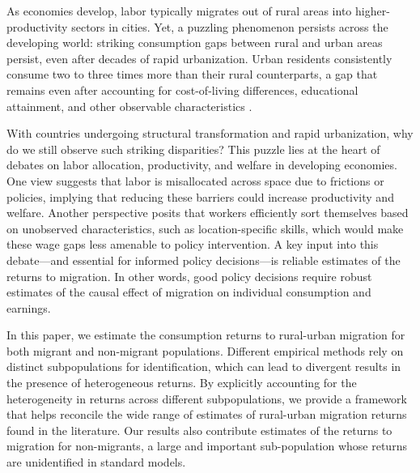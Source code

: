 \documentclass[12pt]{article}
\begin{document}
As economies develop, labor typically migrates out of rural areas into higher-productivity sectors in cities. 
Yet, a puzzling phenomenon persists across the developing world: striking %
consumption gaps between rural and urban areas persist, even after decades of rapid urbanization. 
Urban residents consistently consume two to three times more than their rural counterparts, a gap that remains even after accounting for cost-of-living differences, educational attainment, and other observable characteristics   \citep{youngInequalityUrbanRuralGap2013,gollinAgriculturalProductivityGap2014}. 

With countries undergoing structural transformation and rapid urbanization, why do we still observe such striking %
disparities? 
This puzzle lies at the heart of debates on labor allocation, productivity, and welfare in developing economies.
One view suggests that labor is misallocated across space due to frictions or policies, implying that reducing these barriers could increase productivity and welfare. 
Another perspective posits that workers efficiently sort themselves based on unobserved characteristics, such as location-specific skills, which would make these wage gaps less amenable to policy intervention.
A key input into this debate---and essential for informed policy decisions---is reliable estimates of the returns to migration. 
In other words, good policy decisions require robust estimates of the causal effect of migration on individual consumption and earnings.


In this paper, we estimate the consumption returns to rural-urban migration for both migrant and non-migrant populations. 
Different empirical methods rely on distinct subpopulations for identification, which can lead to divergent results in the presence of heterogeneous returns. 
By explicitly accounting for the heterogeneity in returns across different subpopulations, we provide a framework that helps reconcile the wide range of estimates of rural-urban migration returns found in the literature.
Our results also contribute estimates of the returns to migration for non-migrants, a large and important sub-population whose returns are unidentified in standard models. 


\end{document}

